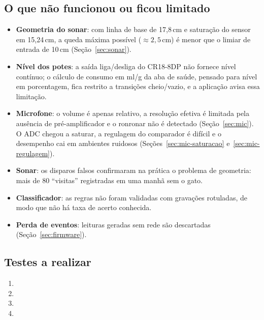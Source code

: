 \subsection{O que não funcionou ou ficou limitado}

\begin{itemize}
  \item \textbf{Geometria do sonar}: com linha de base de 17,8\,cm e saturação do sensor em 15,24\,cm, a queda máxima possível ($\approx 2{,}5$\,cm) é menor que o limiar de entrada de 10\,cm (Seção~\ref{sec:sonar}). 
  \item \textbf{Nível dos potes}: a saída liga/desliga do CR18-8DP não fornece nível contínuo; o cálculo de consumo em ml/g da aba de saúde, pensado para nível em porcentagem, fica restrito a transições cheio/vazio, e a aplicação avisa essa limitação.
  \item \textbf{Microfone}: o volume é apenas relativo, a resolução efetiva é limitada pela ausência de pré-amplificador e o ronronar não é detectado (Seção~\ref{sec:mic}). O ADC chegou a saturar, a regulagem do comparador é difícil e o desempenho cai em ambientes ruidosos (Seções~\ref{sec:mic-saturacao} e~\ref{sec:mic-regulagem}).
  \item \textbf{Sonar}: os disparos falsos confirmaram na prática o problema de geometria: mais de 80 ``visitas'' registradas em uma manhã sem o gato.
  \item \textbf{Classificador}: as regras não foram validadas com gravações rotuladas, de modo que não há taxa de acerto conhecida.
  \item \textbf{Perda de eventos}: leituras geradas sem rede são descartadas (Seção~\ref{sec:firmware}).
\end{itemize}

\subsection{Testes a realizar}
\label{sec:testes}

\begin{enumerate}
  \item {}
  \item {}
  \item {}
  \item {}
\end{enumerate}
